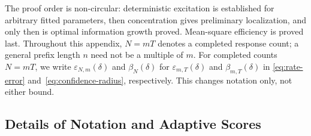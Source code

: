 \documentclass[10pt,twoside,letterpaper]{article}
\begin{document}
The proof order is non-circular: deterministic excitation is established
for arbitrary fitted parameters, then concentration gives preliminary
localization, and only then is optimal information growth proved.
Mean-square efficiency is proved last. Throughout this appendix,
$N=mT$ denotes a completed response count; a general prefix length
$n$ need not be a multiple of $m$.
For completed counts $N=mT$, we write $\varepsilon_{N,m}(\delta)$
and $\beta_N(\delta)$ for $\varepsilon_{m,T}(\delta)$ and
$\beta_{m,T}(\delta)$ in \eqref{eq:rate-error} and~\eqref{eq:confidence-radius},
respectively. This changes notation only, not either bound.

\subsection{Details of Notation and Adaptive Scores}
\label{app:notation}
\end{document}
